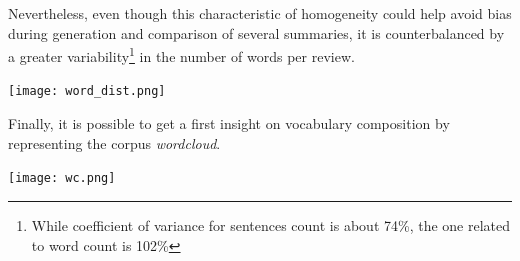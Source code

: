 \documentclass[fleqn,10pt]{SelfArx} %
\begin{document}
Nevertheless, even though this characteristic of homogeneity could help avoid bias during generation and comparison of several summaries, it is counterbalanced by a greater variability\footnote{While coefficient of variance for sentences count is about 74\%, the one related to word count is 102\%} in the number of words per review.
\par
{\centering\vspace{10pt}
\texttt{[image: word\_dist.png]}
\vspace{10pt}
\par}
Finally, it is possible to get a first insight on vocabulary composition by representing the corpus \textit{wordcloud}. 
\par
{\centering\vspace{10pt}
\texttt{[image: wc.png]}
\vspace{10pt}
\par}
\end{document}
